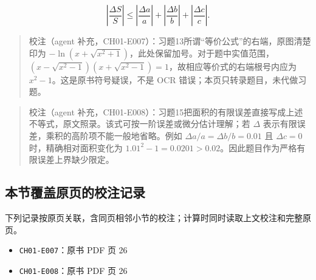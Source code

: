 \documentclass[
  10pt,
  fontset=fandol]{ctexart}
\providecommand{\tightlist}{%
  \setlength{\itemsep}{0pt}\setlength{\parskip}{0pt}}
\begin{document}
\[
\left|\frac{\Delta S}{S}\right| \leqslant \left|\frac{\Delta a}{a}\right| + \left|\frac{\Delta b}{b}\right| + \left|\frac{\Delta c}{c}\right|.
\]

\begin{quote}
校注（agent 补充，CH01-E007）：习题13所谓``等价公式''的右端，原图清楚印为 \(-\ln(x+\sqrt{x^2+1})\)，此处保留加号。对于题中实值范围，\((x-\sqrt{x^2-1})(x+\sqrt{x^2-1})=1\)，故相应等价式的右端根号内应为 \(x^2-1\)。这是原书符号疑误，不是 OCR 错误；本页只转录题目，未代做习题。
\end{quote}

\begin{quote}
校注（agent 补充，CH01-E008）：习题15把面积的有限误差直接写成上述不等式，原文照录。该式可按一阶误差或微分估计理解；若 \(\Delta\) 表示有限误差，乘积的高阶项不能一般地省略。例如 \(\Delta a/a=\Delta b/b=0.01\) 且 \(\Delta c=0\) 时，精确相对面积变化为 \(1.01^2-1=0.0201>0.02\)。因此题目作为严格有限误差上界缺少限定。
\end{quote}

\subsection{本节覆盖原页的校注记录}\label{ux672cux8282ux8986ux76d6ux539fux9875ux7684ux6821ux6ce8ux8bb0ux5f55}

下列记录按原页关联，含同页相邻小节的校注；计算时同时读取上文校注和完整原页。

\begin{itemize}
\tightlist
\item
  \texttt{CH01-E007}：原书 PDF 页 26
\item
  \texttt{CH01-E008}：原书 PDF 页 26
\end{itemize}
\end{document}
